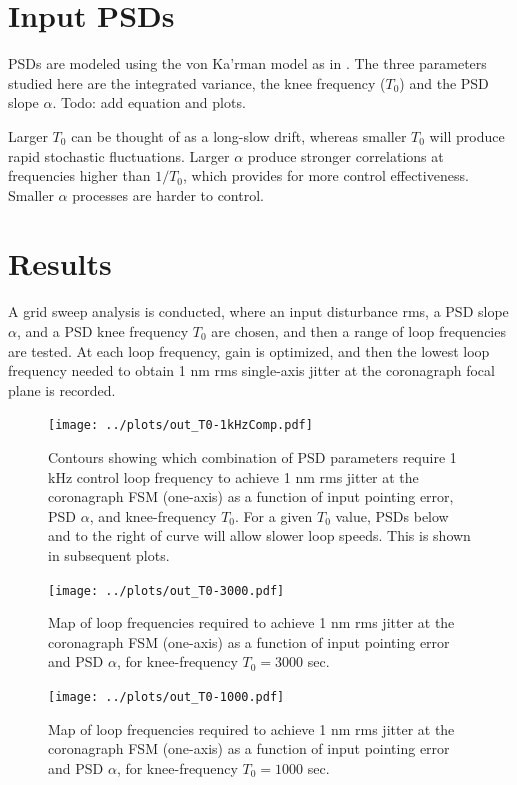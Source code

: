 \documentclass[10pt,preprint]{aastex631}
\begin{document}
\section{Input PSDs}

PSDs are modeled using the von Ka'rman model as in \citet{2019AJ....157...36D}.  The three parameters studied here are the integrated variance, the knee frequency ($T_0$) and the PSD slope $\alpha$.  Todo: add equation and plots.

Larger $T_0$ can be thought of as a long-slow drift, whereas smaller $T_0$ will produce rapid stochastic fluctuations.  Larger $\alpha$ produce stronger correlations at frequencies higher than $1/T_0$, which provides for more control effectiveness.  Smaller $\alpha$ processes are harder to control.

\section{Results}

A grid sweep analysis is conducted, where an input disturbance rms, a PSD slope $\alpha$, and a PSD knee frequency $T_0$ are chosen, and then a range of loop frequencies are tested.  At each loop frequency, gain is optimized, and then the lowest loop frequency needed to obtain 1 nm rms single-axis jitter at the coronagraph focal plane is recorded.  

\begin{figure}
\centering
\texttt{[image: ../plots/out\_T0-1kHzComp.pdf]}
\caption{Contours showing which combination of PSD parameters require 1 kHz control loop frequency to achieve 1 nm rms jitter at the coronagraph FSM (one-axis) as a function of input pointing error, PSD $\alpha$, and knee-frequency $T_0$. For a given $T_0$ value, PSDs below and to the right of curve will allow slower loop speeds.  This is shown in subsequent plots.  \label{fig:T0-1kHzComp}}
\end{figure}

\begin{figure}
\centering
\texttt{[image: ../plots/out\_T0-3000.pdf]}
\caption{Map of loop frequencies required to achieve 1 nm rms jitter at the coronagraph FSM (one-axis) as a function of input pointing error and PSD $\alpha$, for knee-frequency $T_0 = 3000$ sec.  \label{fig:T0-3000}}
\end{figure}

\begin{figure}
\centering
\texttt{[image: ../plots/out\_T0-1000.pdf]}
\caption{Map of loop frequencies required to achieve 1 nm rms jitter at the coronagraph FSM (one-axis) as a function of input pointing error and PSD $\alpha$, for knee-frequency $T_0 = 1000$ sec.  \label{fig:T0-1000}}
\end{figure}
\end{document}
